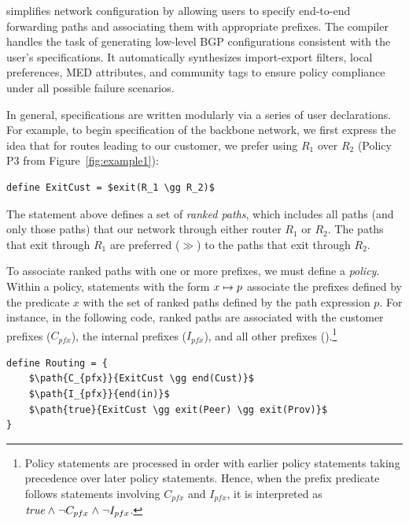 \sysname simplifies network configuration by allowing users to
specify end-to-end forwarding paths and associating them with
appropriate prefixes.  The \sysname compiler handles the task of
generating low-level BGP configurations consistent with the user's
specifications.  It automatically synthesizes
import-export filters, local preferences, MED attributes, and community tags
to ensure policy compliance under all possible failure scenarios.

In general, \sysname specifications are written modularly via a series
of user declarations.
For example, to begin specification of the backbone
network, we first express the idea that for routes leading to our customer,
we prefer using $R_1$ over $R_2$ (Policy P3 from Figure~\ref{fig:example1}):
\begin{lstlisting}[mathescape=true]
define ExitCust = $exit(R_1 \gg R_2)$
\end{lstlisting}
The  statement above defines a set of \emph{ranked paths}, which includes
all paths (and only those paths) that 
our network
through either router $R_1$ or $R_2$.  The paths that exit through $R_1$
are preferred ($\gg$) to the paths that exit through $R_2$.

To associate ranked paths with
one or more prefixes, we must define a \sysname \emph{policy}.
Within a policy, statements with the form $x \mapsto p$
associate the prefixes defined by the predicate $x$ with the set of
ranked paths defined by the path expression $p$.
For instance, in the following code, ranked paths are associated with
the customer prefixes ($C_{pfx}$), the internal prefixes ($I_{pfx}$),
and all other prefixes ().\footnote{Policy statements are processed in
order with earlier policy statements taking precedence over later
policy statements.  Hence, when the prefix predicate  follows
statements involving $C_{pfx}$ and $I_{pfx}$, it is interpreted as
$\textit{true} \mathrel{\wedge} \neg C_{pfx} \mathrel{\wedge} \neg I_{pfx}$.}

\begin{lstlisting}[mathescape=true]
define Routing = {
    $\path{C_{pfx}}{ExitCust \gg end(Cust)}$
    $\path{I_{pfx}}{end(in)}$
    $\path{true}{ExitCust \gg exit(Peer) \gg exit(Prov)}$
}
\end{lstlisting}

